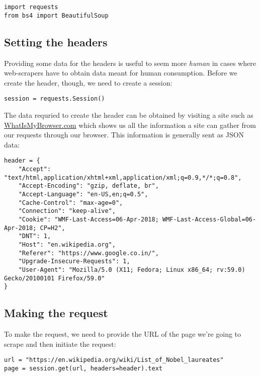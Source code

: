 \vspace{-15pt}
\begin{verbatim}
import requests
from bs4 import BeautifulSoup
\end{verbatim}
\vspace{-10pt}	

\subsection{Setting the headers}
Providing some data for the headers is useful to seem more \textit{human} in cases where web-scrapers have to obtain data meant for human consumption. Before we create the header, though, we need to create a session:

\vspace{-15pt}
\begin{verbatim}
session = requests.Session()
\end{verbatim}
\vspace{-10pt}	

\noindent
The data requried to create the header can be obtained by visiting a site such as \href{https://www.whatismybrowser.com/}{WhatIsMyBrowser.com} which shows us all the information a site can gather from our requests through our browser. This information is generally sent as JSON data:

\vspace{-15pt}
\begin{verbatim}
header = {
	"Accept": "text/html,application/xhtml+xml,application/xml;q=0.9,*/*;q=0.8",
	"Accept-Encoding": "gzip, deflate, br",
	"Accept-Language": "en-US,en;q=0.5",
	"Cache-Control": "max-age=0",
	"Connection": "keep-alive",
	"Cookie": "WMF-Last-Access=06-Apr-2018; WMF-Last-Access-Global=06-Apr-2018; CP=H2",
	"DNT": 1,
	"Host": "en.wikipedia.org",
	"Referer": "https://www.google.co.in/",
	"Upgrade-Insecure-Requests": 1,
	"User-Agent": "Mozilla/5.0 (X11; Fedora; Linux x86_64; rv:59.0) Gecko/20100101 Firefox/59.0"
}
\end{verbatim}
\vspace{-10pt}	

\noindent


\subsection{Making the request}
To make the request, we need to provide the URL of the page we're going to scrape and then initiate the request:

\vspace{-15pt}
\begin{verbatim}
url = "https://en.wikipedia.org/wiki/List_of_Nobel_laureates"
page = session.get(url, headers=header).text
\end{verbatim}
\vspace{-10pt}	

